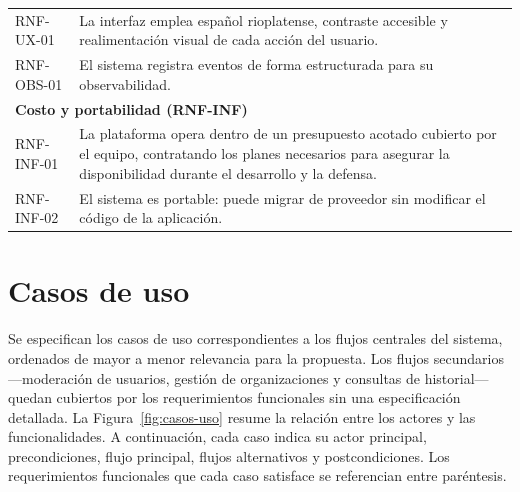 {\begin{longtable}{p{2.6cm}p{11cm}}
    RNF-UX-01 & La interfaz emplea español rioplatense, contraste accesible y realimentación visual de cada acción del usuario. \\
    RNF-OBS-01 & El sistema registra eventos de forma estructurada para su observabilidad. \\
    \midrule
    \multicolumn{2}{l}{\textbf{Costo y portabilidad (RNF-INF)}} \\
    RNF-INF-01 & La plataforma opera dentro de un presupuesto acotado cubierto por el equipo, contratando los planes necesarios para asegurar la disponibilidad durante el desarrollo y la defensa. \\
    RNF-INF-02 & El sistema es portable: puede migrar de proveedor sin modificar el código de la aplicación. \\
\end{longtable}

\section{Casos de uso}

Se especifican los casos de uso correspondientes a los flujos centrales del sistema, ordenados de mayor a menor relevancia para la propuesta. Los flujos secundarios —moderación de usuarios, gestión de organizaciones y consultas de historial— quedan cubiertos por los requerimientos funcionales sin una especificación detallada. La Figura~\ref{fig:casos-uso} resume la relación entre los actores y las funcionalidades. A continuación, cada caso indica su actor principal, precondiciones, flujo principal, flujos alternativos y postcondiciones. Los requerimientos funcionales que cada caso satisface se referencian entre paréntesis.

}
